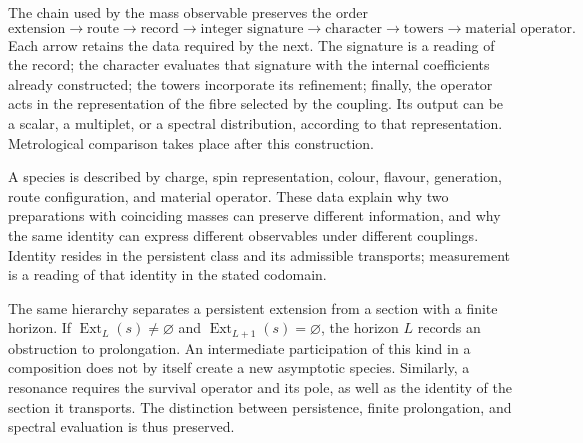 The chain used by the mass observable preserves the order
\begingroup\small
\begin{equation}
 \text{extension}\longrightarrow\text{route}\longrightarrow
 \text{record}\longrightarrow\text{integer signature}\longrightarrow
 \text{character}\longrightarrow\text{towers}\longrightarrow
 \text{material operator}.
 \label{vi:eq:cadena-material}
\end{equation}
\endgroup
Each arrow retains the data required by the next. The signature is
a reading of the record; the character evaluates that signature with the
internal coefficients already constructed; the towers incorporate its
refinement; finally, the operator acts in the representation of the
fibre selected by the coupling. Its output can be a scalar,
a multiplet, or a spectral distribution, according to that representation.
Metrological comparison takes place after this construction.

A species is described by charge, spin representation, colour,
flavour, generation, route configuration, and material operator. These data
explain why two preparations with coinciding masses can
preserve different information, and why the same identity can
express different observables under different couplings. Identity
resides in the persistent class and its admissible transports;
measurement is a reading of that identity in the stated codomain.

The same hierarchy separates a persistent extension from a section with a
finite horizon. If $\operatorname{Ext}_L(s)\ne\varnothing$ and
$\operatorname{Ext}_{L+1}(s)=\varnothing$, the horizon $L$ records
an obstruction to prolongation. An intermediate participation of this
kind in a composition does not by itself create a new asymptotic
species. Similarly, a resonance requires the survival
operator and its pole, as well as the identity of the section
it transports. The distinction between persistence,
finite prolongation, and spectral evaluation is thus preserved.
